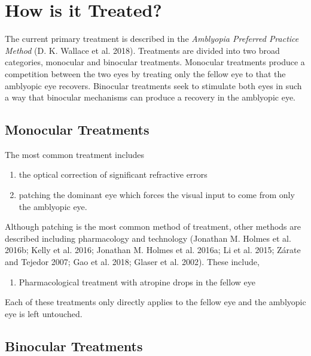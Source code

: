 \documentclass[
  letterpaper,
]{book}
\providecommand{\tightlist}{%
  \setlength{\itemsep}{0pt}\setlength{\parskip}{0pt}}\usepackage{longtable,booktabs,array}
\begin{document}
\hypertarget{how-is-it-treated}{%
\section{How is it Treated?}\label{how-is-it-treated}}

The current primary treatment is described in the \emph{Amblyopia
Preferred Practice Method} (D. K. Wallace et al. 2018). Treatments are
divided into two broad categories, monocular and binocular treatments.
Monocular treatments produce a competition between the two eyes by
treating only the fellow eye to that the amblyopic eye recovers.
Binocular treatments seek to stimulate both eyes in such a way that
binocular mechanisms can produce a recovery in the amblyopic eye.

\hypertarget{monocular-treatments}{%
\subsection{Monocular Treatments}\label{monocular-treatments}}

The most common treatment includes

\begin{enumerate}
\def\labelenumi{\arabic{enumi}.}
\tightlist
\item
  the optical correction of significant refractive errors
\item
  patching the dominant eye which forces the visual input to come from
  only the amblyopic eye.
\end{enumerate}

Although patching is the most common method of treatment, other methods
are described including pharmacology and technology (Jonathan M. Holmes
et al. 2016b; Kelly et al. 2016; Jonathan M. Holmes et al. 2016a; Li et
al. 2015; Zárate and Tejedor 2007; Gao et al. 2018; Glaser et al. 2002).
These include,

\begin{enumerate}
\def\labelenumi{\arabic{enumi}.}
\setcounter{enumi}{2}
\tightlist
\item
  Pharmacological treatment with atropine drops in the fellow eye
\end{enumerate}

Each of these treatments only directly applies to the fellow eye and the
amblyopic eye is left untouched.

\hypertarget{binocular-treatments}{%
\subsection{Binocular Treatments}\label{binocular-treatments}}
\end{document}
